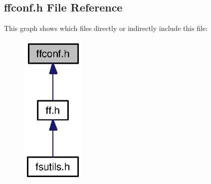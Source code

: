 \subsection{ffconf.\+h File Reference}
\label{ffconf_8h}
This graph shows which files directly or indirectly include this file\+:
\nopagebreak
\begin{figure}[H]
\begin{center}
\leavevmode
\includegraphics[width=87pt]{ffconf_8h__dep__incl}
\end{center}
\end{figure}
